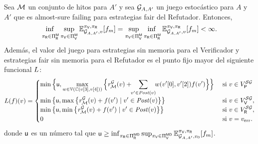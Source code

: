 

\begin{theorem}\label{theo:det-fairness}
Sea $\milestones$ un conjunto de hitos para $A'$ y sea  $\StochG_{A,A'}$ un juego estocástico para $A$ y $A'$ que es almost-sure 
failing para estrategias fair del Refutador.  Entonces,  
\[\adjustlimits
 \inf_{\strat{\Refuter} \in \Strategies{\Refuter}^{\Memoryless}} \sup_{\strat{\Verifier} \in \Strategies{\Verifier}^{\Memoryless}}  \mathbb{E}^{\strat{\Verifier},\strat{\Refuter}}_{\StochG_{A,A'}, v}[\FMask] 
    = 
    \adjustlimits    
    \sup_{\strat{\Verifier} \in \Strategies{\Verifier}^{\Memoryless}} \inf_{\strat{\Refuter} \in \Strategies{\Refuter}^{\Memoryless}}    \mathbb{E}^{\strat{\Verifier},\strat{\Refuter}}_{\StochG_{A,A'}, v}[\FMask] 
    < \infty.
\]
Además, 
el valor del juego para estrategias sin memoria para el Verificador y estrategias fair sin memoria para el Refutador es el punto fijo mayor del siguiente funcional  $\Bellman$: 
%
{\small
\[
    \Bellman(f)(v) =
    \begin{cases}
           \displaystyle \min \Big\{\upperbound,  \max_{w \in \vertices{\couplings{\pr{3}{v}}{\pr{4}{v}}}} \Big\{ \mreward^\StochG(v)  +\!\! \sum_{v' \in \post(v)}\!\! w(\pr{0}{v'},\pr{2}{v'})  f(v') \Big\} \Big\}& \text{ si }v \in V^{\SymbG}_\Probabilistic  \\
           \displaystyle \min \big\{ \upperbound, \max \big\{\mreward^\StochG(v)  + f(v') \mid v' \in \post(v) \big\} \big\} & \text{ si } v \in  V^{\SymbG}_\Verifier, \\
           \displaystyle \min \big\{ \upperbound,  \min \big\{\mreward^\StochG(v)  + f(v') \mid v' \in \post(v) \big\} \big\} & \text{ si } v \in  V^{\SymbG}_\Refuter, \\
           \displaystyle 0 & \text{ si } v=\ErrorSt.
           \displaystyle 
    \end{cases}
\]}%
donde $\upperbound$ es un número tal que
$\upperbound \geq \inf_{\strat{\Refuter} \in \Strategies{\Refuter}^{\Memoryless\Deterministic}} \sup_{\strat{\Verifier} \in \Strategies{\Verifier}^{\Memoryless\Deterministic}} \Expect{\strat{\Verifier}}{\strat{\Refuter}}_{\StochG_{A,A'}, \InitVertex}[\FMask]$.
\end{theorem}

